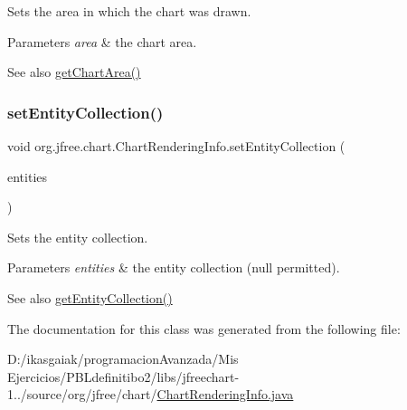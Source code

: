 Sets the area in which the chart was drawn.


\begin{DoxyParams}{Parameters}
{\em area} & the chart area.\\
\hline
\end{DoxyParams}
\begin{DoxySeeAlso}{See also}
\mbox{\hyperlink{classorg_1_1jfree_1_1chart_1_1_chart_rendering_info_aa1fcdd48a4c2ab12d8bd808401185c9b}{get\+Chart\+Area()}} 
\end{DoxySeeAlso}
\mbox{\label{classorg_1_1jfree_1_1chart_1_1_chart_rendering_info_ace7a3e8216473d9d758e99924043d545}} 
\subsubsection{\texorpdfstring{set\+Entity\+Collection()}{setEntityCollection()}}
{\footnotesize\ttfamily void org.\+jfree.\+chart.\+Chart\+Rendering\+Info.\+set\+Entity\+Collection (\begin{DoxyParamCaption}\item[{\mbox{\hyperlink{interfaceorg_1_1jfree_1_1chart_1_1entity_1_1_entity_collection}{Entity\+Collection}}}]{entities }\end{DoxyParamCaption})}

Sets the entity collection.


\begin{DoxyParams}{Parameters}
{\em entities} & the entity collection ({\ttfamily null} permitted).\\
\hline
\end{DoxyParams}
\begin{DoxySeeAlso}{See also}
\mbox{\hyperlink{classorg_1_1jfree_1_1chart_1_1_chart_rendering_info_af353145dd9f3c18dba7e344f02303136}{get\+Entity\+Collection()}} 
\end{DoxySeeAlso}


The documentation for this class was generated from the following file\+:\begin{DoxyCompactItemize}
\item 
D\+:/ikasgaiak/programacion\+Avanzada/\+Mis Ejercicios/\+P\+B\+Ldefinitibo2/libs/jfreechart-\/1../source/org/jfree/chart/\mbox{\hyperlink{_chart_rendering_info_8java}{Chart\+Rendering\+Info.\+java}}\end{DoxyCompactItemize}
